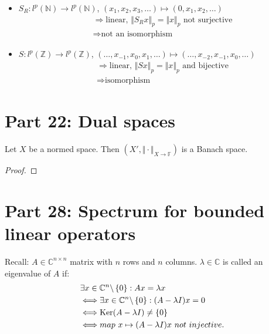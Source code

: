 \documentclass[../../note.tex]{subfiles}
\begin{document}
\begin{example}
    \begin{itemize}
        \item $S_R: l^p(\mathbb{N}) \rightarrow l^p(\mathbb{N})$, $(x_1, x_2,x_3,\dots) \mapsto (0,x_1,x_2,\dots)$ 
        \begin{align}
            &\Longrightarrow \textrm{linear, $\Vert S_R x \Vert_p = \Vert x \Vert_p$ not surjective} \\
            &\Longrightarrow \textrm{not an isomorphism}
        \end{align}
        \item $S: l^p(\mathbb{Z}) \rightarrow l^p(\mathbb{Z})$, $(\dots, x_{-1}, x_0,x_1,\dots) \mapsto (\dots,x_{-2},x_{-1}, x_0, \dots)$ 
        \begin{align}
            &\Longrightarrow \textrm{linear, $\Vert S x \Vert_p = \Vert x \Vert_p$ and bijective} \\
            &\Longrightarrow \textrm{isomorphism}
        \end{align}
    \end{itemize}
\end{example}

\section{Part 22: Dual spaces}
\begin{proposition}
    Let $X$ be a normed space. Then $(X', \Vert \cdot \Vert_{X \rightarrow \mathbb{F}})$ is a Banach space.
\end{proposition}
\begin{proof}
    
\end{proof}

\section{Part 28: Spectrum for bounded linear operators}
Recall: $A \in \mathbb{C}^{n \times n}$ matrix with $n$ rows and $n$ columns. $\lambda \in \mathbb{C}$ is called an eigenvalue of $A$ if:
\begin{align}
    &\exists x \in \mathbb{C}^n \backslash \left\{0\right\}: Ax = \lambda x \\
    &\Longleftrightarrow \exists x \in \mathbb{C}^n \backslash \left\{0\right\}: (A - \lambda I) x = 0 \\
    &\Longleftrightarrow {\rm Ker}(A - \lambda I) \neq \left\{0\right\} \\
    &\Longleftrightarrow map~x \mapsto (A-\lambda I)x~not~injective.
\end{align}
\end{document}
